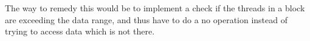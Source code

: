 
The way to remedy this would be to implement a check if the threads in a block are exceeding the data range, and thus have to do a no operation instead of trying to access data which is not there.